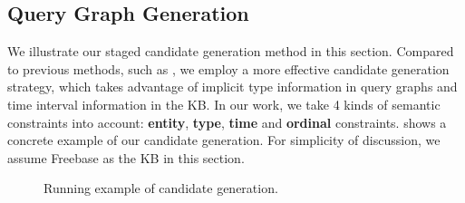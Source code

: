 \subsection{Query Graph Generation}
\label{sec:candgen}

We illustrate our staged candidate generation method in this section.
Compared to previous methods, such as \citet{bao2016constraint}, we employ a more effective candidate
generation strategy, which takes advantage of implicit type information in query graphs
and time interval information in the KB.
In our work, we take 4 kinds of semantic constraints into account:
\textbf{entity}, \textbf{type}, \textbf{time} and \textbf{ordinal} constraints.
 shows a concrete example of our candidate generation.
For simplicity of discussion, we assume Freebase as the KB in this section.


\begin{figure*}
	\centering
	\caption{Running example of candidate generation.}
	\label{fig:candgen}
\end{figure*}


